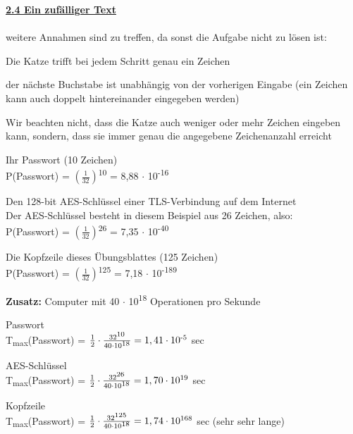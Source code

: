 \documentclass{article}
\begin{document}
\textbf{\underline{2.4 Ein zuf\"alliger Text}} \\
\\
weitere Annahmen sind zu treffen, da sonst die Aufgabe nicht zu lösen ist: \\
\begin{compactenum}[(i)]
	\item Die Katze trifft bei jedem Schritt genau ein Zeichen \\
	\item der nächste Buchstabe ist unabhängig von der vorherigen Eingabe (ein Zeichen kann auch doppelt hintereinander eingegeben werden) \\
	\item Wir beachten nicht, dass die Katze auch weniger oder mehr Zeichen eingeben kann, sondern, dass sie immer genau die angegebene Zeichenanzahl erreicht \\
\end{compactenum}
\begin{compactenum}[a)]
	\item Ihr Passwort (10 Zeichen) \\	
	P(Passwort) = $(\frac{1}{32})$\textsuperscript{10} = 8,88 $\cdot$ 10\textsuperscript{-16} \\
	
	\item Den 128-bit AES-Schl\"ussel einer TLS-Verbindung auf dem Internet \\	
	Der AES-Schl\"ussel besteht in diesem Beispiel aus 26 Zeichen, also: \\
	P(Passwort) = $(\frac{1}{32})$\textsuperscript{26} = 7,35 $\cdot$ 10\textsuperscript{-40} \\
	
	\item Die Kopfzeile dieses \"Ubungsblattes (125 Zeichen) \\
	P(Passwort) = $(\frac{1}{32})$\textsuperscript{125} = 7,18 $\cdot$ 10\textsuperscript{-189} \\
	
	\item \textbf{Zusatz:} Computer mit 40 $\cdot$ 10\textsuperscript{18} Operationen pro Sekunde \\
	\begin{compactenum}[(i)]
		\item Passwort \\
			T\textsubscript{max}(Passwort) = $\frac{1}{2} \cdot\frac{32\textsuperscript{10}}{40 \cdot 10\textsuperscript{18}} = 1,41 \cdot 10\textsuperscript{-5}$ sec \\
		\item AES-Schl\"ussel \\
		T\textsubscript{max}(Passwort) = $\frac{1}{2} \cdot\frac{32\textsuperscript{26}}{40 \cdot 10\textsuperscript{18}} = 1,70 \cdot 10\textsuperscript{19}$ sec \\
		\item Kopfzeile \\
		T\textsubscript{max}(Passwort) = $\frac{1}{2} \cdot\frac{32\textsuperscript{125}}{40 \cdot 10\textsuperscript{18}} =  1,74 \cdot 10\textsuperscript{168}$ sec (sehr sehr lange) \\
	\end{compactenum}
\end{compactenum}
\end{document}
